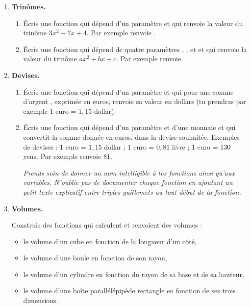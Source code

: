 \documentclass[11pt,class=report,crop=false]{standalone}
\begin{document}
\begin{activite}


\begin{enumerate}
  \item \textbf{Trinômes.}
  
  \begin{enumerate}
    \item Écris une fonction  qui dépend d'un paramètre  et qui renvoie la valeur du trinôme $3x^2-7x+4$. Par exemple  renvoie .
    
    \item Écris une fonction  qui dépend de quatre paramètres , ,  et  et qui renvoie la valeur du trinôme $ax^2+bx+c$. Par exemple  renvoie .
  \end{enumerate}   
  
  
  \item \textbf{Devises.}
  
   \begin{enumerate}
    \item Écris une fonction  qui dépend d'un paramètre et qui pour une somme d'argent , exprimée en euros, renvoie sa valeur en dollars (tu prendras par exemple $1$ euro = $1,15$ dollar).
    
    \item Écris une fonction  qui dépend d'un paramètre  et d'une monnaie  et qui convertit la somme  donnée en euros, dans la devise souhaitée.
    Exemples de devises : 
    $1$ euro = $1,15$ dollar ;
    $1$ euro = $0,81$ livre ;
    $1$ euro = $130$ yens.
    Par exemple  renvoie $81$.   
    
    
  \emph{Prends soin de donner un nom intelligible à tes fonctions ainsi qu'aux variables. N'oublie pas de documenter chaque fonction en ajoutant un petit texte explicatif entre triples guillemets au tout début de ta fonction.}
    
    
  \end{enumerate}   
  
  \item \textbf{Volumes.}
  
   Construis des fonctions qui calculent et renvoient des volumes :
  \begin{itemize}
    \item le volume d'un cube en fonction de la longueur d'un côté,
    \item le volume d'une boule en fonction de son rayon,
    \item le volume d'un cylindre en fonction du rayon de sa base et de sa hauteur,
    \item le volume d'une boîte parallélépipède rectangle en fonction de ses trois dimensions.
   \end{itemize}
   

\end{enumerate}
\end{activite}
\end{document}
